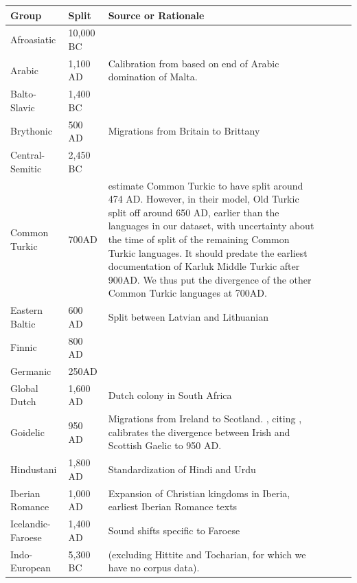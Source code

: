 \documentclass[11pt,a4paper]{article}
\begin{document}
\begin{longtable}{llp{10cm}lll}
Group & Split & Source or Rationale \\ \hline
Afroasiatic & 10,000 BC & \cite{diakonoff1998the} \\
Arabic & 1,100 AD & Calibration from \citep{holman2011automated} based on end of Arabic domination of Malta. \\
Balto-Slavic & 1,400 BC & \citep{gray2003language} \\
	Brythonic & 500 AD & Migrations from Britain to Brittany \citep{holman2011automated}\\ %
Central-Semitic & 2,450 BC & \citep{kitchen2009bayesian}   \\
Common Turkic & 700AD & \cite[p. 49]{savelyev2020bayesian} estimate Common Turkic to have split around 474 AD. However, in their model, Old Turkic split off around 650 AD, earlier than the languages in our dataset, with uncertainty about the time of split of the remaining Common Turkic languages. It should predate the earliest documentation of Karluk Middle Turkic after 900AD. We thus put the divergence of the other Common Turkic languages at 700AD. \\
Eastern Baltic & 600 AD & Split between Latvian and Lithuanian \citep[p. 209]{novotna2011glottochronology}\\
Finnic & 800 AD & \cite[Section 4.1]{maurits2020best} \\
Germanic & 250AD & \cite{gray2003language} \\
Global Dutch & 1,600 AD & Dutch colony in South Africa \\
Goidelic & 950 AD & Migrations from Ireland to Scotland. \citet{holman2011automated}, citing \citet{jackson1951gaelic}, calibrates the divergence between Irish and Scottish Gaelic to 950 AD. \\
Hindustani & 1,800 AD & Standardization of Hindi and Urdu\\
Iberian Romance & 1,000 AD & Expansion of Christian kingdoms in Iberia, earliest Iberian Romance texts \\
Icelandic-Faroese & 1,400 AD & Sound shifts specific to Faroese\\
Indo-European & 5,300 BC & \citep{gray2003language} (excluding Hittite and Tocharian, for which we have no corpus data). \\

\end{longtable}
\end{document}
